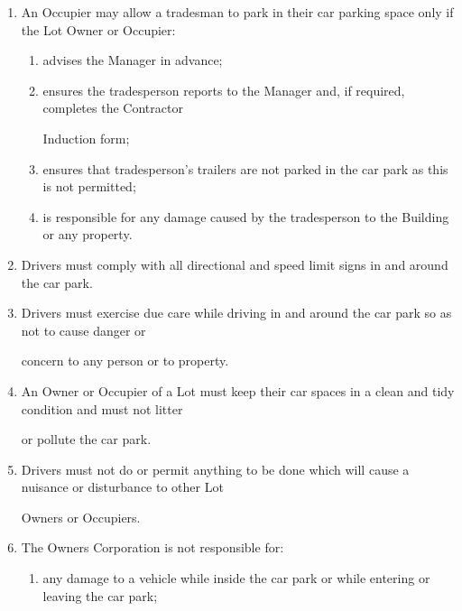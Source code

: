 \documentclass{article}
\begin{document}
\begin{enumerate}[label=\arabic*.]
\begin{enumerate}[label=\arabic{enumi}.\arabic*.]
\begin{enumerate}[label=(\arabic*)]
\item {\fontsize{9.962}{1} An Occupier may allow a tradesman to park in their car parking space only if the Lot Owner or Occupier: }

\begin{enumerate}[label=(\alph*)]
\item {\fontsize{9.962}{1} advises the Manager in advance; }

\item {\fontsize{9.962}{1} ensures the tradesperson reports to the Manager and, if required, completes the Contractor }

{\fontsize{10.02}{1}Induction form; }

\item {\fontsize{9.962}{1} ensures that tradesperson’s trailers are not parked in the car park as this is not permitted; }

\item {\fontsize{9.962}{1} is responsible for any damage caused by the tradesperson to the Building or any property. }

\end{enumerate}
\item {\fontsize{9.962}{1} Drivers must comply with all directional and speed limit signs in and around the car park. }

\item {\fontsize{9.962}{1} Drivers must exercise due care while driving in and around the car park so as not to cause danger or }

{\fontsize{10.02}{1}concern to any person or to property. }

\item {\fontsize{9.962}{1} An Owner or Occupier of a Lot must keep their car spaces in a clean and tidy condition and must not litter }

{\fontsize{10.02}{1}or pollute the car park. }

\item {\fontsize{9.962}{1} Drivers must not do or permit anything to be done which will cause a nuisance or disturbance to other Lot }

{\fontsize{10.02}{1}Owners or Occupiers. }

\item {\fontsize{9.962}{1} The Owners Corporation is not responsible for: }

\begin{enumerate}[label=(\alph*)]
\item {\fontsize{9.962}{1} any damage to a vehicle while inside the car park or while entering or leaving the car park; }


\end{enumerate}
\end{enumerate}
\end{enumerate}
\end{enumerate}
\end{document}
